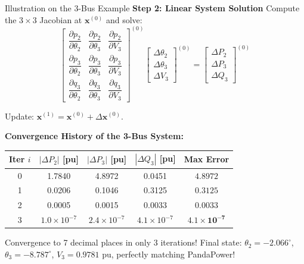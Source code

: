 \begin{frame}[allowframebreaks]{Illustration on the 3-Bus Example}
    \newpage
    \textbf{Step 2: Linear System Solution}
    Compute the $3 \times 3$ Jacobian at $\mathbf{x}^{(0)}$ and solve:
    $$\begin{bmatrix}
        \dfrac{\partial p_2}{\partial \theta_2} & \dfrac{\partial p_2}{\partial \theta_3} & \dfrac{\partial p_2}{\partial V_3} \\[0.5em]
        \dfrac{\partial p_3}{\partial \theta_2} & \dfrac{\partial p_3}{\partial \theta_3} & \dfrac{\partial p_3}{\partial V_3} \\[0.5em]
        \dfrac{\partial q_3}{\partial \theta_2} & \dfrac{\partial q_3}{\partial \theta_3} & \dfrac{\partial q_3}{\partial V_3}
    \end{bmatrix}^{(0)}
    \begin{bmatrix}
        \Delta \theta_2 \\ \Delta \theta_3 \\ \Delta V_3
    \end{bmatrix}^{(0)}
    =
    \begin{bmatrix}
        \Delta P_2 \\ \Delta P_3 \\ \Delta Q_3
    \end{bmatrix}^{(0)}$$
    
    Update: $\mathbf{x}^{(1)} = \mathbf{x}^{(0)} + \Delta \mathbf{x}^{(0)}$.

    \newpage
    \textbf{Convergence History of the 3-Bus System:}
    \begin{table}[h]
        \centering
        \small
        \begin{tabular}{ccccc}
            \toprule
            \textbf{Iter} $i$ & $|\Delta P_2|$ [pu] & $|\Delta P_3|$ [pu] & $|\Delta Q_3|$ [pu] & \textbf{Max Error} \\
            \midrule
            0 & 1.7840 & 4.8972 & 0.0451 & $4.8972$ \\
            1 & 0.0206 & 0.1046 & 0.3125 & $0.3125$ \\
            2 & 0.0005 & 0.0015 & 0.0033 & $0.0033$ \\
            3 & $1.0 \times 10^{-7}$ & $2.4 \times 10^{-7}$ & $4.1 \times 10^{-7}$ & $\mathbf{4.1 \times 10^{-7}}$ \\
            \bottomrule
        \end{tabular}
    \end{table}

    \begin{block}{Convergence to 7 decimal places in only 3 iterations!}
        \small Final state: $\theta_2 = -2.066^\circ$, $\theta_3 = -8.787^\circ$, $V_3 = 0.9781\text{ pu}$, perfectly matching PandaPower!
        \href{https://github.com/bcornelusse/ELEC0447-analysis-power-systems/tree/master/notebooks/power_flow_3-bus_Newton_Raphson.ipynb}{}
    \end{block}
\end{frame}

